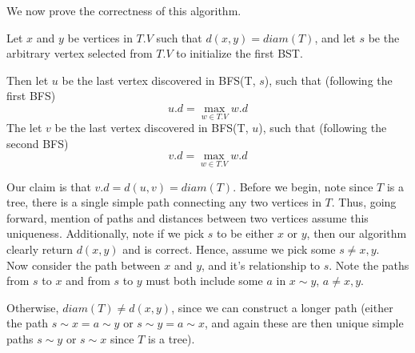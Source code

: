 \documentclass[paper=a4, fontsize=11pt]{scrartcl} %
\numberwithin{equation}{section} %
\numberwithin{figure}{section} %
\numberwithin{table}{section} %
\begin{document}
We now prove the correctness of this algorithm.

Let $x$ and $y$ be vertices in $T.V$ such that $d(x,y) = diam(T)$, and let $s$ be the arbitrary vertex selected from $T.V$ to initialize the first BST.

Then let $u$ be the last vertex discovered in BFS(T, $s$), such that (following the first BFS)
\[u.d = \max_{w \in T.V} w.d\]
The let $v$ be the last vertex discovered in BFS(T, $u$), such that (following the second BFS)
\[v.d = \max_{w \in T.V} w.d\]

Our claim is that $v.d = d(u, v) = diam(T)$. Before we begin, note since $T$ is a tree, there is a single simple path connecting any two vertices in $T$. Thus, going forward, mention of paths and distances between two vertices assume this uniqueness. Additionally, note if we pick $s$ to be either $x$ or $y$, then our algorithm clearly return $d(x,y)$ and is correct. Hence, assume we pick some $s \ne x, y$. \\
 
Now consider the path between $x$ and $y$, and it's relationship to $s$. Note the paths from $s$ to $x$ and from $s$ to $y$ must both include some $a$ in $x \sim y$, $a \ne x, y$.

\begin{center}
\end{center}

Otherwise, $diam(T) \ne d(x,y)$, since we can construct a longer path (either the path $s \sim x = a \sim y$ or $s \sim y = a \sim x$, and again these are then unique simple paths $s \sim y$ or $s \sim x$ since $T$ is a tree).
\end{document}

